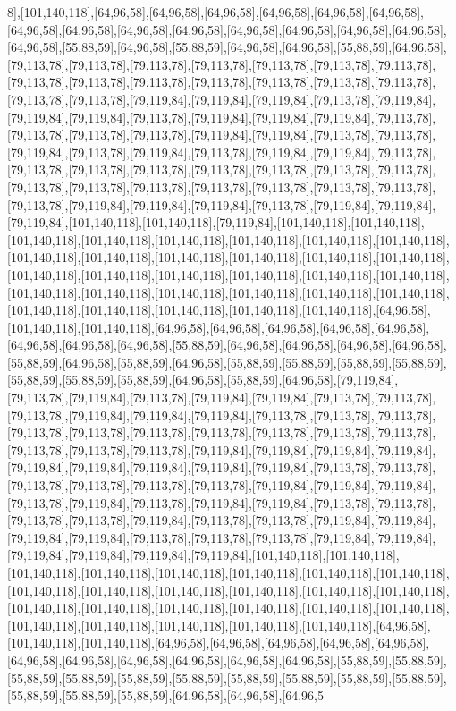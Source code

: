 8],[101,140,118],[64,96,58],[64,96,58],[64,96,58],[64,96,58],[64,96,58],[64,96,58],[64,96,58],[64,96,58],[64,96,58],[64,96,58],[64,96,58],[64,96,58],[64,96,58],[64,96,58],[64,96,58],[55,88,59],[64,96,58],[55,88,59],[64,96,58],[64,96,58],[55,88,59],[64,96,58],[79,113,78],[79,113,78],[79,113,78],[79,113,78],[79,113,78],[79,113,78],[79,113,78],[79,113,78],[79,113,78],[79,113,78],[79,113,78],[79,113,78],[79,113,78],[79,113,78],[79,113,78],[79,113,78],[79,119,84],[79,119,84],[79,119,84],[79,113,78],[79,119,84],[79,119,84],[79,119,84],[79,113,78],[79,119,84],[79,119,84],[79,119,84],[79,113,78],[79,113,78],[79,113,78],[79,113,78],[79,119,84],[79,119,84],[79,113,78],[79,113,78],[79,119,84],[79,113,78],[79,119,84],[79,113,78],[79,119,84],[79,119,84],[79,113,78],[79,113,78],[79,113,78],[79,113,78],[79,113,78],[79,113,78],[79,113,78],[79,113,78],[79,113,78],[79,113,78],[79,113,78],[79,113,78],[79,113,78],[79,113,78],[79,113,78],[79,113,78],[79,119,84],[79,119,84],[79,119,84],[79,113,78],[79,119,84],[79,119,84],[79,119,84],[101,140,118],[101,140,118],[79,119,84],[101,140,118],[101,140,118],[101,140,118],[101,140,118],[101,140,118],[101,140,118],[101,140,118],[101,140,118],[101,140,118],[101,140,118],[101,140,118],[101,140,118],[101,140,118],[101,140,118],[101,140,118],[101,140,118],[101,140,118],[101,140,118],[101,140,118],[101,140,118],[101,140,118],[101,140,118],[101,140,118],[101,140,118],[101,140,118],[101,140,118],[101,140,118],[101,140,118],[101,140,118],[101,140,118],[101,140,118],[64,96,58],[101,140,118],[101,140,118],[64,96,58],[64,96,58],[64,96,58],[64,96,58],[64,96,58],[64,96,58],[64,96,58],[64,96,58],[55,88,59],[64,96,58],[64,96,58],[64,96,58],[64,96,58],[55,88,59],[64,96,58],[55,88,59],[64,96,58],[55,88,59],[55,88,59],[55,88,59],[55,88,59],[55,88,59],[55,88,59],[55,88,59],[64,96,58],[55,88,59],[64,96,58],[79,119,84],[79,113,78],[79,119,84],[79,113,78],[79,119,84],[79,119,84],[79,113,78],[79,113,78],[79,113,78],[79,119,84],[79,119,84],[79,119,84],[79,113,78],[79,113,78],[79,113,78],[79,113,78],[79,113,78],[79,113,78],[79,113,78],[79,113,78],[79,113,78],[79,113,78],[79,113,78],[79,113,78],[79,113,78],[79,119,84],[79,119,84],[79,119,84],[79,119,84],[79,119,84],[79,119,84],[79,119,84],[79,119,84],[79,119,84],[79,113,78],[79,113,78],[79,113,78],[79,113,78],[79,113,78],[79,113,78],[79,119,84],[79,119,84],[79,119,84],[79,113,78],[79,119,84],[79,113,78],[79,119,84],[79,119,84],[79,113,78],[79,113,78],[79,113,78],[79,113,78],[79,119,84],[79,113,78],[79,113,78],[79,119,84],[79,119,84],[79,119,84],[79,119,84],[79,113,78],[79,113,78],[79,113,78],[79,119,84],[79,119,84],[79,119,84],[79,119,84],[79,119,84],[79,119,84],[101,140,118],[101,140,118],[101,140,118],[101,140,118],[101,140,118],[101,140,118],[101,140,118],[101,140,118],[101,140,118],[101,140,118],[101,140,118],[101,140,118],[101,140,118],[101,140,118],[101,140,118],[101,140,118],[101,140,118],[101,140,118],[101,140,118],[101,140,118],[101,140,118],[101,140,118],[101,140,118],[101,140,118],[101,140,118],[64,96,58],[101,140,118],[101,140,118],[64,96,58],[64,96,58],[64,96,58],[64,96,58],[64,96,58],[64,96,58],[64,96,58],[64,96,58],[64,96,58],[64,96,58],[64,96,58],[55,88,59],[55,88,59],[55,88,59],[55,88,59],[55,88,59],[55,88,59],[55,88,59],[55,88,59],[55,88,59],[55,88,59],[55,88,59],[55,88,59],[55,88,59],[64,96,58],[64,96,58],[64,96,5